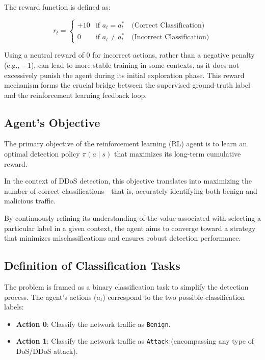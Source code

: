 \documentclass[12pt]{report}
\begin{document}
The reward function is defined as:

\[
r_t =
\begin{cases}
+10 & \text{if } a_t = a_t^* \quad \text{(Correct Classification)} \\
0   & \text{if } a_t \ne a_t^* \quad \text{(Incorrect Classification)}
\end{cases}
\]

Using a neutral reward of 0 for incorrect actions, rather than a negative penalty (e.g., $-1$), can lead to more stable training in some contexts, as it does not excessively punish the agent during its initial exploration phase. This reward mechanism forms the crucial bridge between the supervised ground-truth label and the reinforcement learning feedback loop.

\subsection{Agent's Objective}

The primary objective of the reinforcement learning (RL) agent is to learn an optimal detection policy $\pi(a \mid s)$ that maximizes its long-term cumulative reward. 

In the context of DDoS detection, this objective translates into maximizing the number of correct classifications—that is, accurately identifying both benign and malicious traffic. 

By continuously refining its understanding of the value associated with selecting a particular label in a given context, the agent aims to converge toward a strategy that minimizes misclassifications and ensures robust detection performance.

\subsection{Definition of Classification Tasks}

The problem is framed as a binary classification task to simplify the detection process. The agent's actions ($a_t$) correspond to the two possible classification labels:

\begin{itemize}
  \item \textbf{Action 0}: Classify the network traffic as \texttt{Benign}.
  \item \textbf{Action 1}: Classify the network traffic as \texttt{Attack} (encompassing any type of DoS/DDoS attack).
\end{itemize}
\end{document}

